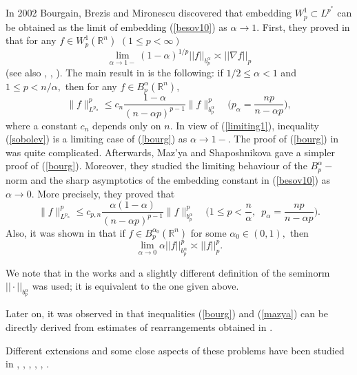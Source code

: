 \documentclass[12pt,twoside,reqno]{amsart}
\numberwithin{equation}{section}
\theoremstyle{definition}
\numberwithin{equation}{section}
\begin{document}
In 2002 Bourgain, Brezis and Mironescu \cite{BBM2} discovered that
embedding $W_p^1\subset L^{p^*}$ can be obtained as the limit of embedding
(\ref{besov10}) as ${\alpha}\to 1.$ First, they proved in \cite{BBM1} that
for any $f\in W_p^1({\mathbb{R}}^n)\,\, (1\le p<\infty)$
\begin{equation}\label{limiting1}
\lim_{{\alpha}\to 1-}(1-{\alpha})^{1/p}||f||_{b_p^{\alpha}}\asymp||\nabla f||_p
\end{equation}
(see also \cite{Br1}, \cite[Section 14.3]{Leo1},
\cite[Section 10.2]{Maz2}). The main result in \cite{BBM2} is the
following:  if $1/2\le {\alpha}<1$ and $1\le p<n/{\alpha},$ then for any $f\in
B_p^{\alpha}({\mathbb R}^n)$,
\begin{equation}\label{bourg}
\|f\|^p_{L^{p_{\alpha}}}\le c_n\frac{1-{\alpha}}{(n-{\alpha} p)^{p-1}}
\|f\|_{b^{\alpha}_p}^p\quad\Big(p_{\alpha}=\frac{np}{n-{\alpha} p}\Big),
\end{equation}
where a constant $c_n$ depends only on $n$. In view of
(\ref{limiting1}), inequality
(\ref{sobolev}) is a limiting case of (\ref{bourg}) as ${\alpha}\to 1-$. The proof of
(\ref{bourg}) in \cite{BBM2} was quite complicated. Afterwards,
Maz'ya and Shaposhnikova \cite{MS} gave a simpler proof of
(\ref{bourg}). Moreover, they studied the limiting behaviour of the
$B_p^{\alpha}-$norm and the sharp asymptotics of the embedding constant in
(\ref{besov10})  as ${\alpha}\to 0$. More precisely, they proved that
\begin{equation}\label{mazya}
\|f\|^p_{L^{p_{\alpha}}}\le c_{p,n}\frac{{\alpha}(1-{\alpha})}{(n-{\alpha} p)^{p-1}}
\|f\|_{b^{\alpha}_p}^p\quad\Big(1\le p< \frac{n}{\alpha}, \,\,\,p_{\alpha}=\frac{np}{n-{\alpha} p}\Big).
\end{equation}
Also, it was  shown  in \cite{MS} that if $f\in B_p^{{\alpha}_0}({\mathbb
R}^n)$ for some ${\alpha}_0\in (0,1),$ then
\begin{equation}\label{mazya1}
\lim_{{\alpha}\to 0} {\alpha} ||f||_{b^{\alpha}_p}^p \asymp ||f||_p^p.
\end{equation}

We note that in the works \cite{BBM2} and \cite{MS} a slightly
different definition of the  seminorm $||\cdot||_{b^{\alpha}_p}$ was used;
it is equivalent to the one given above.

Later on, it was observed in \cite{KL} that inequalities
(\ref{bourg}) and (\ref{mazya}) can be directly derived from
estimates of rearrangements obtained in \cite{K1988}.

Different  extensions and some close aspects of these problems have been studied in \cite{CGO}, \cite{KMX},
\cite{KL}, \cite{LS}, \cite{Mil}, \cite{Tri}.
\end{document}
